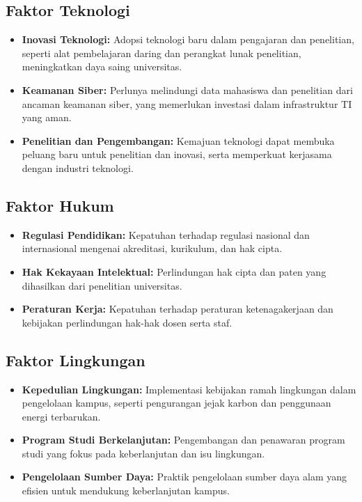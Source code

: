 \subsection{Faktor Teknologi}
\begin{itemize}
	\item \textbf{Inovasi Teknologi:} Adopsi teknologi baru dalam pengajaran dan penelitian, seperti alat pembelajaran daring dan perangkat lunak penelitian, meningkatkan daya saing universitas.
	\item \textbf{Keamanan Siber:} Perlunya melindungi data mahasiswa dan penelitian dari ancaman keamanan siber, yang memerlukan investasi dalam infrastruktur TI yang aman.
	\item \textbf{Penelitian dan Pengembangan:} Kemajuan teknologi dapat membuka peluang baru untuk penelitian dan inovasi, serta memperkuat kerjasama dengan industri teknologi.
\end{itemize}

\subsection{Faktor Hukum}
\begin{itemize}
	\item \textbf{Regulasi Pendidikan:} Kepatuhan terhadap regulasi nasional dan internasional mengenai akreditasi, kurikulum, dan hak cipta.
	\item \textbf{Hak Kekayaan Intelektual:} Perlindungan hak cipta dan paten yang dihasilkan dari penelitian universitas.
	\item \textbf{Peraturan Kerja:} Kepatuhan terhadap peraturan ketenagakerjaan dan kebijakan perlindungan hak-hak dosen serta staf.
\end{itemize}

\subsection{Faktor Lingkungan}
\begin{itemize}
	\item \textbf{Kepedulian Lingkungan:} Implementasi kebijakan ramah lingkungan dalam pengelolaan kampus, seperti pengurangan jejak karbon dan penggunaan energi terbarukan.
	\item \textbf{Program Studi Berkelanjutan:} Pengembangan dan penawaran program studi yang fokus pada keberlanjutan dan isu lingkungan.
	\item \textbf{Pengelolaan Sumber Daya:} Praktik pengelolaan sumber daya alam yang efisien untuk mendukung keberlanjutan kampus.
\end{itemize}

